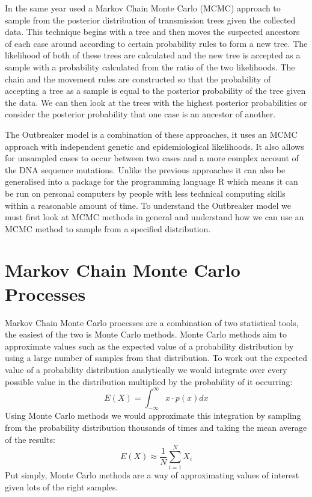 \documentclass[11pt,a4paper]{report}
\begin{document}
In the same year \citet{Morelli12} used a Markov Chain Monte Carlo (MCMC) approach to sample from the posterior distribution of transmission trees given the collected data. This technique begins with a tree and then moves the suspected ancestors of each case around according to certain probability rules to form a new tree. The likelihood of both of these trees are calculated and the new tree is accepted as a sample with a probability calculated from the ratio of the two likelihoods. The chain and the movement rules are constructed so that the probability of accepting a tree as a sample is equal to the posterior probability of the tree given the data. We can then look at the trees with the highest posterior probabilities or consider the posterior probability that one case is an ancestor of another.

The Outbreaker model is a combination of these approaches, it uses an MCMC approach with independent genetic and epidemiological likelihoods. It also allows for unsampled cases to occur between two cases and a more complex account of the DNA sequence mutations. Unlike the previous approaches it can also be generalised into a package for the programming language R which means it can be run on personal computers by people with less technical computing skills within a reasonable amount of time. To understand the Outbreaker model we must first look at MCMC methods in general and understand how we can use an MCMC method to sample from a specified distribution.

\section{Markov Chain Monte Carlo Processes}
Markov Chain Monte Carlo processes are a combination of two statistical tools, the easiest of the two is Monte Carlo methods. Monte Carlo methods aim to approximate values such as the expected value of a probability distribution by using a large number of samples from that distribution. To work out the expected value of a probability distribution analytically we would integrate over every possible value in the distribution multiplied by the probability of it occurring:
\[ E(X) = \int_{-\infty}^{\infty} x \cdot p(x) dx \]
Using Monte Carlo methods we would approximate this integration by sampling from the probability distribution thousands of times and taking the mean average of the results:
\[ E(X) \approx \frac{1}{N}\sum_{i=1}^{N} X_i \] 
Put simply, Monte Carlo methods are a way of approximating values of interest given lots of the right samples.
\end{document}
